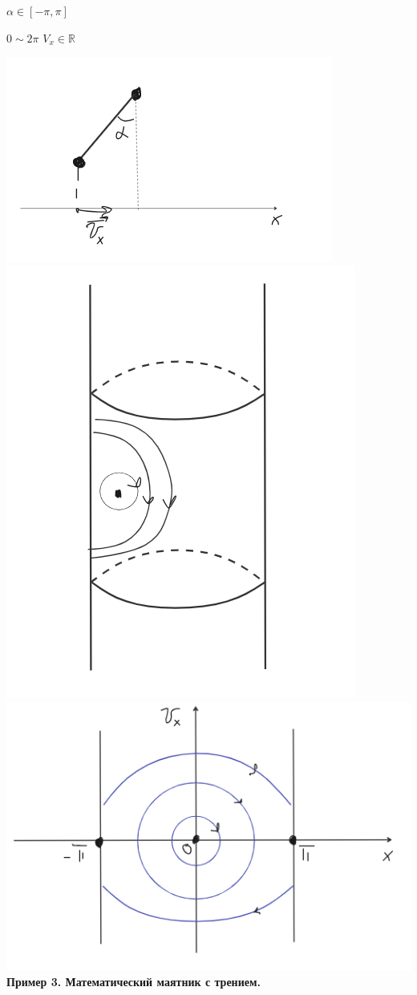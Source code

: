 \documentclass[12pt,a4paper]{article}
\begin{document}
$\alpha \in [-\pi , \pi]$

$0\sim 2\pi$
$V_x \in \mathbb{R}$


\includegraphics[scale=0.5]{images/Section 3. Dinamic System/image12}
\includegraphics[scale=0.3]{images/Section 3. Dinamic System/image6}
\newline
\includegraphics[scale=0.4]{images/Section 3. Dinamic System/image7}
 \newpage \textbf{Пример 3. Математический маятник с трением.}
\end{document}
